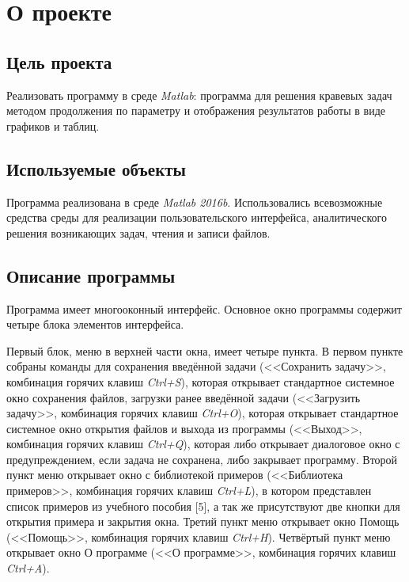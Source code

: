 \documentclass[oneside,final,12pt]{extreport}
\begin{document}
\setcounter{page}{2}
\tableofcontents

\chapter*{О проекте}

\section*{Цель проекта}

Реализовать программу в среде \textit{Matlab}: программа для решения кравевых задач методом продолжения по параметру и отображения результатов работы в виде графиков и таблиц.

\section*{Используемые объекты}

Программа реализована в среде \textit{Matlab 2016b}. Использовались всевозможные средства среды для реализации пользовательского интерфейса, аналитического решения возникающих задач, чтения и записи файлов.\\ 


\section*{Описание программы}

Программа имеет многооконный интерфейс. Основное окно программы содержит четыре блока элементов интерфейса.

Первый блок, меню в верхней части окна, имеет четыре пункта. В первом пункте собраны команды для сохранения введённой задачи (<<Сохранить задачу>>, комбинация горячих клавиш \textit{Ctrl+S}), которая открывает стандартное системное окно сохранения файлов, загрузки ранее введённой задачи (<<Загрузить задачу>>, комбинация горячих клавиш \textit{Ctrl+O}), которая открывает стандартное системное окно открытия файлов и выхода из программы (<<Выход>>, комбинация горячих клавиш \textit{Ctrl+Q}), которая либо открывает диалоговое окно с предупреждением, если задача не сохранена, либо закрывает программу. Второй пункт меню открывает окно с библиотекой примеров (<<Библиотека примеров>>, комбинация горячих клавиш \textit{Ctrl+L}), в котором представлен список примеров из учебного пособия [5], а так же присутствуют две кнопки для открытия примера и закрытия окна. Третий пункт меню открывает окно Помощь (<<Помощь>>, комбинация горячих клавиш \textit{Ctrl+H}). Четвёртый пункт меню открывает окно О программе (<<О программе>>, комбинация горячих клавиш \textit{Ctrl+A}).
\end{document}

